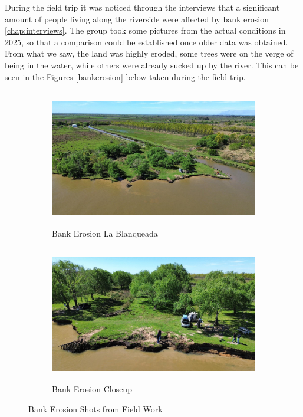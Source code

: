During the field trip it was noticed through the interviews that a significant amount of people living along the riverside were affected by bank erosion \ref{chap:interviews}. The group took some pictures from the actual conditions in 2025, so that a comparison could be established once older data was obtained. From what we saw, the land was highly eroded, some trees were on the verge of being in the water, while others were already sucked up by the river. This can be seen in the Figures \ref{bankerosion} below taken during the field trip.

\begin{figure}[H]
    \centering
    \begin{subfigure}[b]{0.6\textwidth}
        \includegraphics[width=\linewidth, height=6cm]{figures/ch4/bankerosioncamping.jpg}
        \caption{Bank Erosion La Blanqueada}
        
    \end{subfigure}
    
    \vspace{0.5cm}
    

    \begin{subfigure}[b]{0.6\textwidth}
        \includegraphics[width=\linewidth, height=6cm]{figures/ch4/bankerosioncamping2.jpg}
        \caption{Bank Erosion Closeup}
        
    \end{subfigure}
    \caption{Bank Erosion Shots from Field Work}
    \label{fig:Bank Erosion shots from field work}
\end{figure}
\label{bankerosion}


